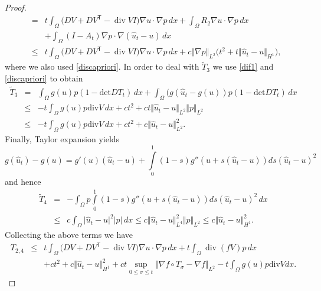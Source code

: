 \documentclass[a4paper,10pt]{article}
\newcommand{\dx}{\,dx}
\theoremstyle{plain}
\theoremstyle{plain}
\numberwithin{equation}{section}
\DeclareMathOperator{\Div}{div}
\begin{document}
\begin{proof}
\begin{eqnarray}
& = & 
t \int_{\Omega} \bigl( D V + D V^{\mathsf{T}} - \Div V I  \bigr) \nabla u \cdot \nabla p  \dx 
+ \int_{\Omega} R_2 \nabla u \cdot \nabla p  \dx \nonumber \\
& & + \int_{\Omega} (I - A_t) \nabla p \cdot \nabla ( \hat u_t - u)  \dx 
\nonumber\\
& \leq &  t \int_{\Omega} \bigl( D V + D V^{\mathsf{T}} - \Div V I  \bigr) \nabla u \cdot \nabla p  \dx + c \Vert \nabla p \Vert_{L^2} \bigl( t^2 +  t \Vert \hat u_t - u \Vert_{H^1} \bigr),  \label{eq:tildet2}
\end{eqnarray}
where we also used  \eqref{discapriori}. In order to deal with $\tilde T_3$ we use \eqref{dif1} and \eqref{discapriori} to obtain
\begin{eqnarray}
\tilde T_3 & =& \int_{\Omega} g(u) p (1 - \mbox{det} DT_t) \dx + \int_{\Omega} (g(\hat u_t - g(u)) p (1 - \mbox{det} D T_t) \dx \nonumber \\
& \leq & -t\int_{\Omega} g(u)p \mbox{div}V \dx + c t^2+ c t  \Vert \hat u_t - u \Vert_{L^2} \Vert p \Vert_{L^2} \nonumber \\
& \leq &  -t\int_{\Omega} g(u)p \mbox{div}V \dx + c t^2+ c \Vert \hat u_t - u \Vert_{L^2}^2. \label{eq:tilde3}
\end{eqnarray}
Finally, Taylor expansion yields
\[
g(\hat u_t)-g(u) = g'(u)(\hat u_t-u) + \int\limits_0^1 (1-s)g''(u+s(\hat u_t-u))ds (\hat u_t-u)^2
\]
and hence
\begin{eqnarray}
\tilde T_4 & = & 
- \int_{\Omega} p \int\limits_0^1 (1-s)g''(u+s(\hat u_t-u))ds (\hat u_t-u)^2 \dx \label{eq:tilde4} \\
& \leq & c 
 \int_{\Omega} \vert \hat u_t-u\vert^2  \vert p\vert \dx \le c 
 \Vert \hat u_t -u\Vert_{L^4}^2  \Vert p\Vert_{L^2} \leq  c \Vert \hat u_t-u\Vert_{H^1}^2. \nonumber
\end{eqnarray}
Collecting the above terms we have
\begin{eqnarray}
T_{2,4} & \leq &  t \int_{\Omega} \bigl( D V + D V^{\mathsf{T}} - \Div V I  \bigr) \nabla u \cdot \nabla p  \dx + 
t \int_{\Omega} \Div( f V) p  \dx  \nonumber \\
& & +  c t^2 +c \Vert \hat u_t - u \Vert_{H^1}^2 + c t  \sup_{0 \leq \sigma \leq t} \Vert \nabla f \circ T_\sigma - \nabla f \Vert_{L^2} -t\int_{\Omega} g(u)p \mbox{div}Vdx. \label{t24}
\end{eqnarray}


\end{proof}
\end{document}
